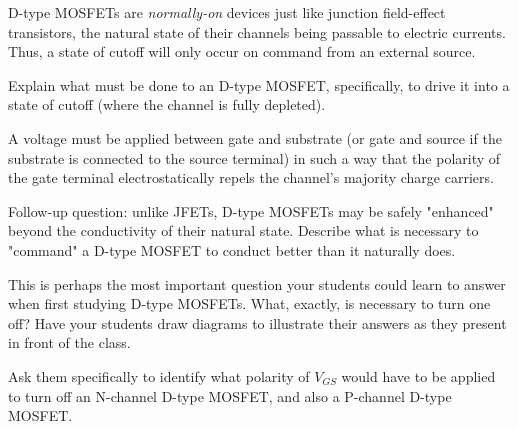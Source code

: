 

D-type MOSFETs are {\it normally-on} devices just like junction field-effect transistors, the natural state of their channels being passable to electric currents.  Thus, a state of cutoff will only occur on command from an external source.

Explain what must be done to an D-type MOSFET, specifically, to drive it into a state of cutoff (where the channel is fully depleted).







A voltage must be applied between gate and substrate (or gate and source if the substrate is connected to the source terminal) in such a way that the polarity of the gate terminal electrostatically repels the channel's majority charge carriers.

\vskip 10pt

Follow-up question: unlike JFETs, D-type MOSFETs may be safely "enhanced" beyond the conductivity of their natural state.  Describe what is necessary to "command" a D-type MOSFET to conduct better than it naturally does.







This is perhaps the most important question your students could learn to answer when first studying D-type MOSFETs.  What, exactly, is necessary to turn one off?  Have your students draw diagrams to illustrate their answers as they present in front of the class.

Ask them specifically to identify what polarity of $V_{GS}$ would have to be applied to turn off an N-channel D-type MOSFET, and also a P-channel D-type MOSFET.




